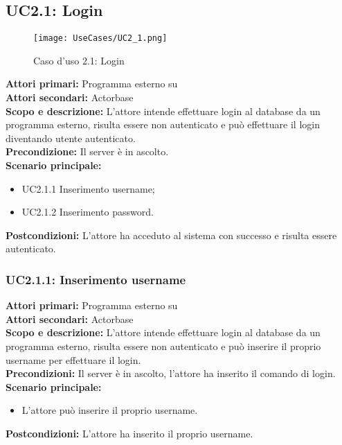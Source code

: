 \documentclass{scalatekids-article}
\begin{document}
\subsection{UC2.1: Login}

\begin{figure}[H]
  \begin{center}
    \texttt{[image: UseCases/UC2\_1.png]}
    \caption{Caso d'uso 2.1: Login}
  \end{center}
\end{figure}
\textbf{Attori primari:} Programma esterno su \\
\textbf{Attori secondari:} Actorbase\\
\textbf{Scopo e descrizione:}
L'attore intende effettuare login al database da un programma  esterno, risulta essere non autenticato e può effettuare il login diventando utente autenticato.\\
\textbf{Precondizione:} Il server è in ascolto.\\
\textbf{Scenario principale:}
\begin{itemize}
\item UC2.1.1 Inserimento username;
\item UC2.1.2 Inserimento password.
\end{itemize}
\textbf{Postcondizioni:} L'attore ha acceduto al sistema con successo e risulta essere autenticato.

\subsubsection{UC2.1.1: Inserimento username}

\textbf{Attori primari:} Programma esterno su \\
\textbf{Attori secondari:} Actorbase\\
\textbf{Scopo e descrizione:}
L'attore intende effettuare login al database da un programma  esterno, risulta essere non autenticato e può inserire il proprio username per effettuare il login.\\
\textbf{Precondizioni:} Il server è in ascolto, l'attore ha inserito il comando di login.\\
\textbf{Scenario principale:}
\begin{itemize}
\item L'attore può inserire il proprio username.
\end{itemize}
\textbf{Postcondizioni:} L'attore ha inserito il proprio username.
\end{document}
